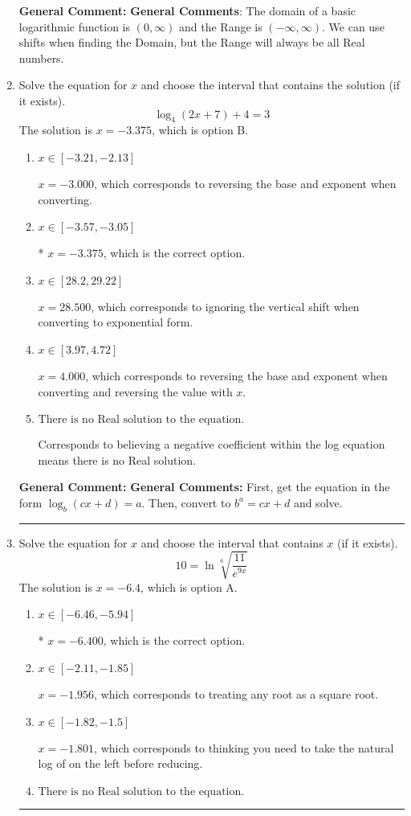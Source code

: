 \documentclass{extbook}[14pt]
\newcommand{\litem}[1]{\item #1

\rule{\textwidth}{0.4pt}}
\begin{document}
\begin{enumerate}
{\textbf{General Comment:} \textbf{General Comments}: The domain of a basic logarithmic function is $(0, \infty)$ and the Range is $(-\infty, \infty)$. We can use shifts when finding the Domain, but the Range will always be all Real numbers.
}
\litem{
Solve the equation for $x$ and choose the interval that contains the solution (if it exists).
\[ \log_{4}{(2x+7)}+4 = 3 \]The solution is \( x = -3.375 \), which is option B.\begin{enumerate}[label=\Alph*.]
\item \( x \in [-3.21, -2.13] \)

$x = -3.000$, which corresponds to reversing the base and exponent when converting.
\item \( x \in [-3.57, -3.05] \)

* $x = -3.375$, which is the correct option.
\item \( x \in [28.2, 29.22] \)

$x = 28.500$, which corresponds to ignoring the vertical shift when converting to exponential form.
\item \( x \in [3.97, 4.72] \)

$x = 4.000$, which corresponds to reversing the base and exponent when converting and reversing the value with $x$.
\item \( \text{There is no Real solution to the equation.} \)

Corresponds to believing a negative coefficient within the log equation means there is no Real solution.
\end{enumerate}

\textbf{General Comment:} \textbf{General Comments:} First, get the equation in the form $\log_b{(cx+d)} = a$. Then, convert to $b^a = cx+d$ and solve.
}
\litem{
 Solve the equation for $x$ and choose the interval that contains $x$ (if it exists).
\[  10 = \ln{\sqrt[6]{\frac{11}{e^{9x}}}} \]The solution is \( x = -6.4 \), which is option A.\begin{enumerate}[label=\Alph*.]
\item \( x \in [-6.46, -5.94] \)

* $x = -6.400$, which is the correct option.
\item \( x \in [-2.11, -1.85] \)

$x = -1.956$, which corresponds to treating any root as a square root.
\item \( x \in [-1.82, -1.5] \)

$x = -1.801$, which corresponds to thinking you need to take the natural log of on the left before reducing.
\item \( \text{There is no Real solution to the equation.} \)


\end{enumerate}}
\end{enumerate}
\end{document}
